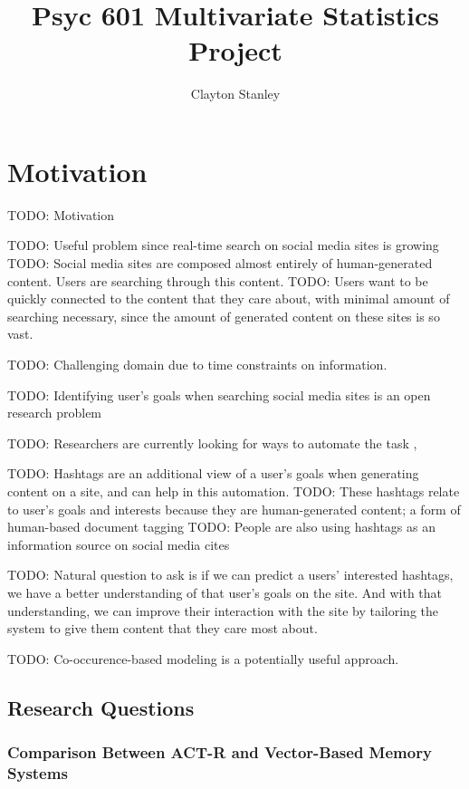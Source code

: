 \documentclass[man]{apa6}
\title{Psyc 601 Multivariate Statistics Project}
\author{Clayton Stanley}
\affiliation{Rice University}
\begin{document}
\maketitle

\tableofcontents
\newpage

\section{Motivation}

TODO: Motivation

TODO: Useful problem since real-time search on social media sites is growing \cite{Jansen2011}
TODO: Social media sites are composed almost entirely of human-generated content.
Users are searching through this content.
TODO: Users want to be quickly connected to the content that they care about, with minimal amount of searching necessary, since the amount of generated content on these sites is so vast.

TODO: Challenging domain due to time constraints on information. \cite{Bauer2012}

TODO: Identifying user's goals when searching social media sites is an open research problem \cite{Rose2004}

TODO: Researchers are currently looking for ways to automate the task \cite{Lee2005}, \cite{Jansen2008}

TODO: Hashtags are an additional view of a user's goals when generating content on a site, and can help in this automation.
TODO: These hashtags relate to user's goals and interests because they are human-generated content; a form of human-based document tagging \cite{Chang2010}
TODO: People are also using hashtags as an information source on social media cites \cite{Diakopoulos2010} \cite{Kwak2010}

TODO: Natural question to ask is if we can predict a users' interested hashtags, we have a better understanding of that user's goals on the site.
And with that understanding, we can improve their interaction with the site by tailoring the system to give them content that they care most about.

TODO: Co-occurence-based modeling is a potentially useful approach. \cite{Efron2010}

\subsection{Research Questions}

\subsubsection{Comparison Between ACT-R and Vector-Based Memory Systems}
\end{document}
